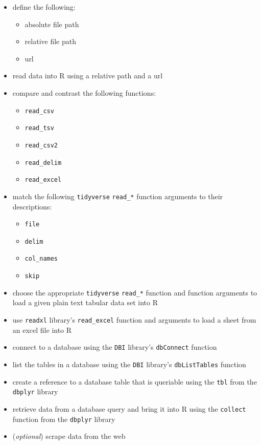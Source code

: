 \documentclass[
]{article}
\providecommand{\tightlist}{%
  \setlength{\itemsep}{0pt}\setlength{\parskip}{0pt}}
\begin{document}
\begin{itemize}
\item
  define the following:

  \begin{itemize}
  \tightlist
  \item
    absolute file path
  \item
    relative file path
  \item
    url
  \end{itemize}
\item
  read data into R using a relative path and a url
\item
  compare and contrast the following functions:

  \begin{itemize}
  \tightlist
  \item
    \texttt{read\_csv}
  \item
    \texttt{read\_tsv}
  \item
    \texttt{read\_csv2}
  \item
    \texttt{read\_delim}
  \item
    \texttt{read\_excel}
  \end{itemize}
\item
  match the following \texttt{tidyverse} \texttt{read\_*} function
  arguments to their descriptions:

  \begin{itemize}
  \tightlist
  \item
    \texttt{file}
  \item
    \texttt{delim}
  \item
    \texttt{col\_names}
  \item
    \texttt{skip}
  \end{itemize}
\item
  choose the appropriate \texttt{tidyverse} \texttt{read\_*} function
  and function arguments to load a given plain text tabular data set
  into R
\item
  use \texttt{readxl} library's \texttt{read\_excel} function and
  arguments to load a sheet from an excel file into R
\item
  connect to a database using the \texttt{DBI} library's
  \texttt{dbConnect} function
\item
  list the tables in a database using the \texttt{DBI} library's
  \texttt{dbListTables} function
\item
  create a reference to a database table that is queriable using the
  \texttt{tbl} from the \texttt{dbplyr} library
\item
  retrieve data from a database query and bring it into R using the
  \texttt{collect} function from the \texttt{dbplyr} library
\item
  (\emph{optional}) scrape data from the web


\end{itemize}
\end{document}

